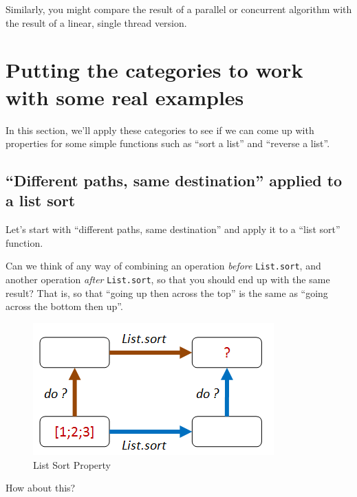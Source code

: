 Similarly, you might compare the result of a parallel or concurrent algorithm with the result of a linear, single thread version.


\section{Putting the categories to work with some real examples}


In this section, we'll apply these categories to see if we can come up with properties for some simple functions such as ``sort a list'' and ``reverse a list''.

\subsection{``Different paths, same destination'' applied to a list sort}


Let's start with ``different paths, same destination'' and apply it to a ``list sort'' function.

Can we think of any way of combining an operation \textit{before} \texttt{List.sort}, and another operation \textit{after} \texttt{List.sort}, so that you should end up with the same result? That is, so that ``going up then across the top'' is the same as ``going across the bottom then up''.
\begin{figure}[htbp]
 \centering
 \includegraphics[width=.95\linewidth]{./pics/choosing_properties_8.png}
 \caption{List Sort Property}
 \label{fig:choosing_properties_8}
\end{figure}
How about this?

